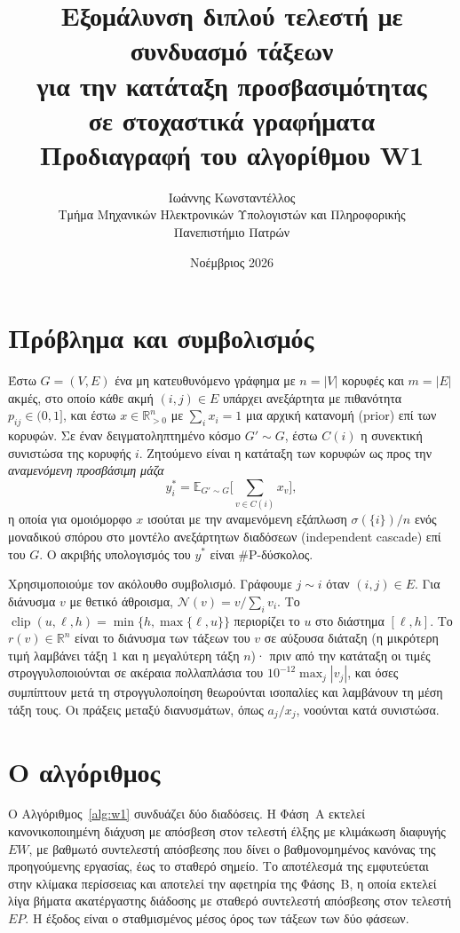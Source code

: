 \documentclass[11pt,a4paper]{article}
\title{\textbf{Εξομάλυνση διπλού τελεστή με συνδυασμό τάξεων\\ για την κατάταξη προσβασιμότητας\\ σε στοχαστικά γραφήματα}\\[6pt]
\large Προδιαγραφή του αλγορίθμου W1}
\author{Ιωάννης Κωνσταντέλλος\\[2pt]
\small Τμήμα Μηχανικών Ηλεκτρονικών Υπολογιστών και Πληροφορικής\\
\small Πανεπιστήμιο Πατρών}
\date{Νοέμβριος 2026}
\newcommand{\N}{\mathcal{N}}
\DeclareMathOperator{\clip}{clip}
\begin{document}
\maketitle

\section{Πρόβλημα και συμβολισμός}

Έστω $G=(V,E)$ ένα μη κατευθυνόμενο γράφημα με $n=|V|$ κορυφές και $m=|E|$ ακμές, στο οποίο κάθε ακμή $(i,j)\in E$ υπάρχει ανεξάρτητα με πιθανότητα $p_{ij}\in(0,1]$, και έστω $x\in\mathbb{R}^n_{>0}$ με $\sum_i x_i=1$ μια αρχική κατανομή (prior) επί των κορυφών. Σε έναν δειγματοληπτημένο κόσμο $G'\sim G$, έστω $C(i)$ η συνεκτική συνιστώσα της κορυφής $i$. Ζητούμενο είναι η κατάταξη των κορυφών ως προς την \emph{αναμενόμενη προσβάσιμη μάζα}
\[
y^*_i=\mathbb{E}_{G'\sim G}\Big[\sum_{v\in C(i)}x_v\Big],
\]
η οποία για ομοιόμορφο $x$ ισούται με την αναμενόμενη εξάπλωση $\sigma(\{i\})/n$ ενός μοναδικού σπόρου στο μοντέλο ανεξάρτητων διαδόσεων (independent cascade) επί του $G$. Ο ακριβής υπολογισμός του $y^*$ είναι \#P-δύσκολος.

Χρησιμοποιούμε τον ακόλουθο συμβολισμό. Γράφουμε $j\sim i$ όταν $(i,j)\in E$. Για διάνυσμα $v$ με θετικό άθροισμα, $\N(v)=v/\sum_i v_i$. Το $\clip(u,\ell,h)=\min\{h,\max\{\ell,u\}\}$ περιορίζει το $u$ στο διάστημα $[\ell,h]$. Το $r(v)\in\mathbb{R}^n$ είναι το διάνυσμα των τάξεων του $v$ σε αύξουσα διάταξη (η μικρότερη τιμή λαμβάνει τάξη $1$ και η μεγαλύτερη τάξη $n$)· πριν από την κατάταξη οι τιμές στρογγυλοποιούνται σε ακέραια πολλαπλάσια του $10^{-12}\max_j|v_j|$, και όσες συμπίπτουν μετά τη στρογγυλοποίηση θεωρούνται ισοπαλίες και λαμβάνουν τη μέση τάξη τους. Οι πράξεις μεταξύ διανυσμάτων, όπως $a_j/x_j$, νοούνται κατά συνιστώσα.

\section{Ο αλγόριθμος}

Ο Αλγόριθμος~\ref{alg:w1} συνδυάζει δύο διαδόσεις. Η Φάση~Α εκτελεί κανονικοποιημένη διάχυση με απόσβεση στον τελεστή έλξης με κλιμάκωση διαφυγής $EW$, με βαθμωτό συντελεστή απόσβεσης που δίνει ο βαθμονομημένος κανόνας της προηγούμενης εργασίας, έως το σταθερό σημείο. Το αποτέλεσμά της εμφυτεύεται στην κλίμακα περίσσειας και αποτελεί την αφετηρία της Φάσης~Β, η οποία εκτελεί λίγα βήματα ακατέργαστης διάδοσης με σταθερό συντελεστή απόσβεσης στον τελεστή $EP$. Η έξοδος είναι ο σταθμισμένος μέσος όρος των τάξεων των δύο φάσεων.
\end{document}
